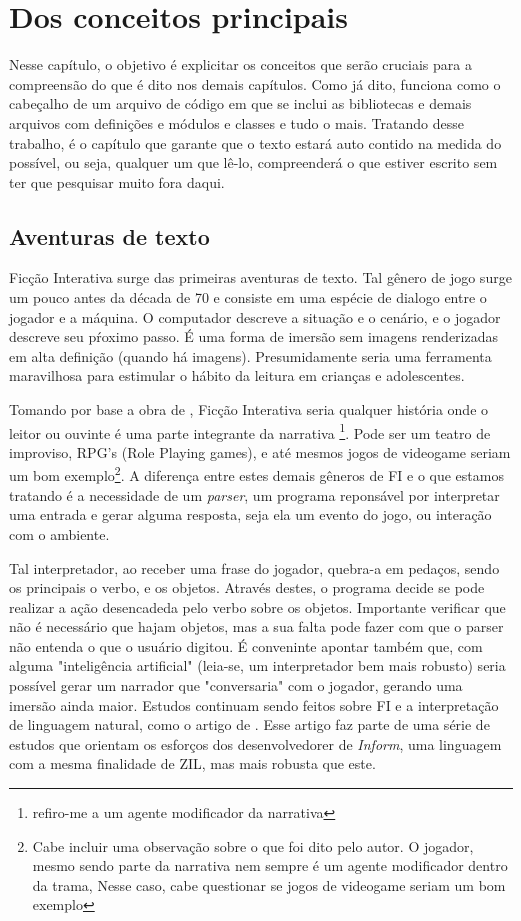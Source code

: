 \chapter{Dos conceitos principais}
\label{cap:main-concepts}

Nesse capítulo, o objetivo é explicitar os conceitos que serão cruciais para a
compreensão do que é dito nos demais capítulos. Como já dito, funciona como o
cabeçalho de um arquivo de código em que se inclui as bibliotecas e demais
arquivos com definições e módulos e classes e tudo o mais. Tratando desse
trabalho, é o capítulo que garante que o texto estará auto contido na medida do
possível, ou seja, qualquer um que lê-lo, compreenderá o que estiver escrito sem
ter que pesquisar muito fora daqui.

\section{Aventuras de texto}
\label{sec:text-adventure}

Ficção Interativa surge \citep{IF2} das primeiras aventuras de texto. Tal gênero
de jogo surge um pouco antes da década de 70 e consiste em uma espécie de dialogo
entre o jogador e a máquina. O computador descreve a situação e o cenário, e o
jogador descreve seu pŕoximo passo. É uma forma de imersão sem imagens
renderizadas em alta definição (quando há imagens). Presumidamente seria uma
ferramenta maravilhosa para estimular o hábito da leitura em crianças e
adolescentes.

Tomando por base a obra de \citep{Jim:06}, Ficção Interativa seria qualquer
história onde o leitor ou ouvinte é uma parte integrante da narrativa
\footnote{refiro-me a um agente modificador da narrativa}. Pode ser um teatro de
improviso, RPG's (Role Playing games), e até mesmos jogos de videogame seriam um
bom exemplo\footnote{Cabe incluir uma observação sobre o que foi dito pelo autor.
O jogador, mesmo sendo parte da narrativa nem sempre é um agente modificador
dentro da trama, Nesse caso, cabe questionar se jogos de videogame seriam um bom
exemplo}. A diferença entre estes demais gêneros de FI e o que estamos tratando é
a necessidade de um \emph{parser}, um programa reponsável por interpretar uma
entrada e gerar alguma resposta, seja ela um evento do jogo, ou interação com o
ambiente.

Tal interpretador, ao receber uma frase do jogador, quebra-a em pedaços, sendo
os principais o verbo, e os objetos. Através destes, o programa decide se pode
realizar a ação desencadeda pelo verbo sobre os objetos. Importante verificar
que não é necessário que hajam objetos, mas a sua falta pode fazer com que o
parser não entenda o que o usuário digitou. É conveninte apontar também que, com
alguma "inteligência artificial" (leia-se, um interpretador bem mais robusto)
seria possível gerar um narrador que "conversaria" com o jogador, gerando uma
imersão ainda maior. Estudos continuam sendo feitos sobre FI e a interpretação
de linguagem natural, como o artigo de \citep{Nel:06}. Esse artigo faz parte de
uma série de estudos que orientam os esforços dos desenvolvedorer de
\emph{Inform}, uma linguagem com a mesma finalidade de ZIL, mas mais robusta
que este.

